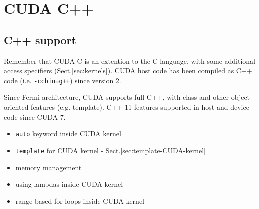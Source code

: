 \chapter{CUDA C++}
\label{chap:CUDA_C++}

\section{C++ support}
\label{sec:c++-support}

Remember that CUDA C is an extention to the C language, with some additional
access specifiers (Sect.\ref{sec:kernels}). CUDA host code has been compiled as
C++ code (i.e. \verb!-ccbin=g++!) since version 2.

Since Fermi architecture, CUDA supports full C++, with class and other
object-oriented features (e.g. template). C++ 11 features supported in host and
device code since CUDA 7.
\begin{itemize}
  \item  \verb!auto! keyword inside CUDA kernel
  \item \verb!template! for CUDA kernel - Sect.\ref{sec:template-CUDA-kernel}
  
  \item memory management
  
  \item using lambdas inside CUDA kernel
  
  \item range-based for loops inside CUDA kernel
\end{itemize}


